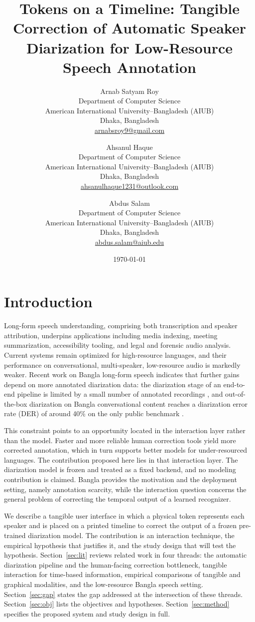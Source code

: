 \documentclass[10pt,a4paper,twocolumn]{article}
\title{\textbf{Tokens on a Timeline: Tangible Correction of Automatic
       Speaker Diarization for Low-Resource Speech Annotation}}
\author{
  Arnab Satyam Roy \\
  Department of Computer Science \\
  American International University--Bangladesh (AIUB) \\
  Dhaka, Bangladesh \\
  \href{mailto:arnabsroy9@gmail.com}{arnabsroy9@gmail.com}
  \and
  Ahsanul Haque \\
  Department of Computer Science \\
  American International University--Bangladesh (AIUB) \\
  Dhaka, Bangladesh \\
  \href{mailto:ahsanulhaque1231@outlook.com}{ahsanulhaque1231@outlook.com}
  \and
  Abdus Salam \\
  Department of Computer Science \\
  American International University--Bangladesh (AIUB) \\
  Dhaka, Bangladesh \\
  \href{mailto:abdus.salam@aiub.edu}{abdus.salam@aiub.edu}
}
\date{\today}
\begin{document}
\twocolumn[\begin{@twocolumnfalse}
\maketitle
\end{@twocolumnfalse}]
\onehalfspacing

\section{Introduction}\label{sec:intro}

Long-form speech understanding, comprising both transcription and
speaker attribution, underpins applications including media
indexing, meeting summarization, accessibility tooling, and legal
and forensic audio analysis. Current systems remain optimized for
high-resource languages, and their performance on conversational,
multi-speaker, low-resource audio is markedly weaker. Recent work
on Bangla long-form speech indicates that further gains depend on more annotated
diarization data: the diarization stage of an end-to-end pipeline is
limited by a small number of annotated recordings \citep{bhuiyan2026banglawsd}, and out-of-the-box
diarization on Bangla conversational content reaches a
diarization error rate (DER) of around 40\% on the only public
benchmark \citep{tabib2026bengaliloop}.

This constraint points to an opportunity located in the interaction
layer rather than the model. Faster and more reliable human
correction tools yield more corrected annotation, which in turn
supports better models for under-resourced languages. The
contribution proposed here lies in that interaction layer. The
diarization model is frozen and treated as a fixed backend, and no
modeling contribution is claimed. Bangla provides the motivation
and the deployment setting, namely annotation scarcity, while the
interaction question concerns the general problem of correcting
the temporal output of a learned recognizer.

We describe a tangible user interface in which a physical token
represents each speaker and is placed on a printed timeline to
correct the output of a frozen pre-trained diarization model. The
contribution is an interaction technique, the empirical hypothesis
that justifies it, and the study design that will test the
hypothesis. Section~\ref{sec:lit} reviews related work in four
threads: the automatic diarization pipeline and the human-facing
correction bottleneck, tangible interaction for time-based
information, empirical comparisons of tangible and graphical
modalities, and the low-resource Bangla speech setting.
Section~\ref{sec:gap} states the gap addressed at the intersection
of these threads. Section~\ref{sec:obj} lists the objectives and
hypotheses. Section~\ref{sec:method} specifies the proposed system
and study design in full.
\end{document}
